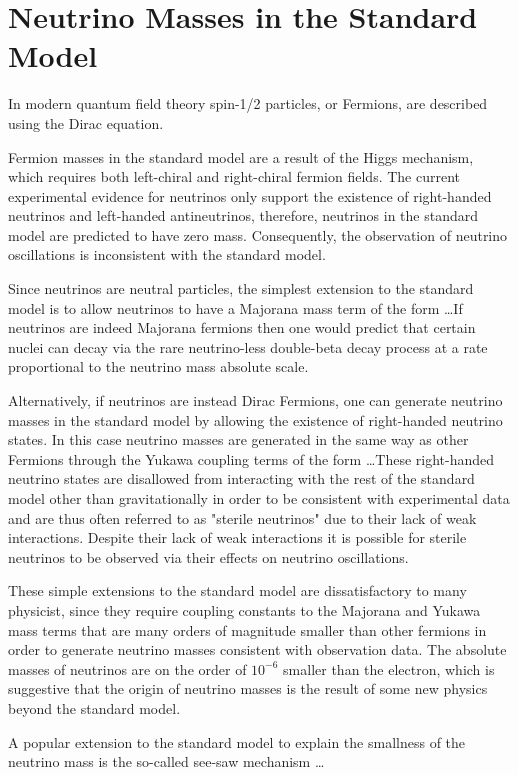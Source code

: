 \section{Neutrino Masses in the Standard Model}

In modern quantum field theory spin-1/2 particles, or Fermions, are described using the Dirac equation. 

Fermion masses in the standard model are a result of the Higgs mechanism, which requires both left-chiral and right-chiral fermion fields. The current experimental evidence for neutrinos only support the existence of right-handed neutrinos and left-handed antineutrinos, therefore, neutrinos in the standard model are predicted to have zero mass. Consequently, the observation of neutrino oscillations is inconsistent with the standard model.

Since neutrinos are neutral particles, the simplest extension to the standard model is to allow neutrinos to have a Majorana mass term of the form \ldots If neutrinos are indeed Majorana fermions then one would predict that certain nuclei can decay via the rare neutrino-less double-beta decay process at a rate proportional to the neutrino mass absolute scale. 

Alternatively, if neutrinos are instead Dirac Fermions, one can generate neutrino masses in the standard model by allowing the existence of right-handed neutrino states. In this case neutrino masses are generated in the same way as other Fermions through the Yukawa coupling terms of the form \ldots These right-handed neutrino states are disallowed from interacting with the rest of the standard model other than gravitationally in order to be consistent with experimental data and are thus often referred to as "sterile neutrinos" due to their lack of weak interactions. Despite their lack of weak interactions it is possible for sterile neutrinos to be observed via their effects on neutrino oscillations.

These simple extensions to the standard model are dissatisfactory to many physicist, since they require coupling constants to the Majorana and Yukawa mass terms that are many orders of magnitude smaller than other fermions in order to generate neutrino masses consistent with observation data. The absolute masses of neutrinos are on the order of $10^{-6}$ smaller than the electron, which is suggestive that the origin of neutrino masses is the result of some new physics beyond the standard model.

A popular extension to the standard model to explain the smallness of the neutrino mass is the so-called see-saw mechanism \ldots

